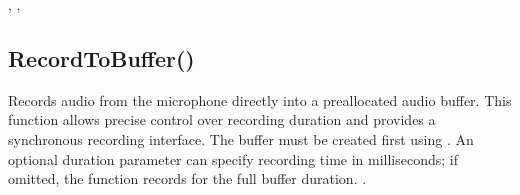 \documentclass[letterpaper,10pt,english]{sphinxmanual}
\begin{document}
\sphinxAtStartPar
{}

\begin{sphinxVerbatim}[commandchars=\\\{\}]
\end{sphinxVerbatim}

\sphinxAtStartPar
{}

\sphinxAtStartPar
{}, , 

\ignorespaces 

\subsection{RecordToBuffer()}
\label{\detokenize{reference/peblobjects:recordtobuffer}}\label{\detokenize{reference/peblobjects:index-43}}
\sphinxAtStartPar
{}

\sphinxAtStartPar
{}

\sphinxAtStartPar
Records audio from the microphone directly into a pre\sphinxhyphen{}allocated audio buffer. This function allows precise control over recording duration and provides a synchronous recording interface. The buffer must be created first using . An optional duration parameter can specify recording time in milliseconds; if omitted, the function records for the full buffer duration. .

\sphinxAtStartPar
{}

\begin{sphinxVerbatim}[commandchars=\\\{\}]
\end{sphinxVerbatim}
\end{document}

